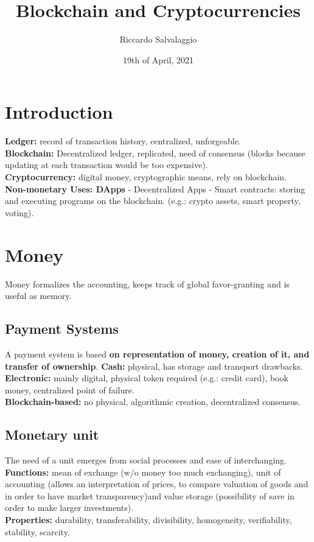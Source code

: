\documentclass{article}
\title{Blockchain and Cryptocurrencies}
\author{Riccardo Salvalaggio}
\date{19th of April, 2021}
\begin{document}
\maketitle
\newpage
\tableofcontents
\newpage

\section{Introduction}
\textbf{Ledger: }record of transaction history, centralized, unforgeable.\\
\textbf{Blockchain: }Decentralized ledger, replicated, need of consensus (blocks because updating at each transaction would be too expensive).\\
\textbf{Cryptocurrency: }digital money, cryptographic means, rely on blockchain.\\
\textbf{Non-monetary Uses: DApps} - Decentralized Apps - Smart contracts: storing and executing programs on the blockchain. (e.g.: crypto assets, smart property, voting).\\



\section{Money}
Money formalizes the accounting, keeps track of global favor-granting and is useful as memory.
\subsection{Payment Systems}
A payment system is based \textbf{on representation of money, creation of it, and transfer of ownership}.
\textbf{Cash: }physical, has storage and transport drawbacks.\\
\textbf{Electronic: }mainly digital, physical token required (e.g.: credit card), book money, centralized point of failure.\\
\textbf{Blockchain-based: }no physical, algorithmic creation, decentralized consensus.\\
\subsection{Monetary unit}
The need of a unit emerges from social processes and ease of interchanging. \textbf{Functions: }mean of exchange (w/o money too much exchanging), unit of accounting (allows an interpretation of prices, to compare valuation of goods and in order to have market transparency)and value storage (possibility of save in order to make larger investments).\\
\textbf{Properties: }durability, transferability, divisibility, homogeneity, verifiability, stability, scarcity.
\end{document}
